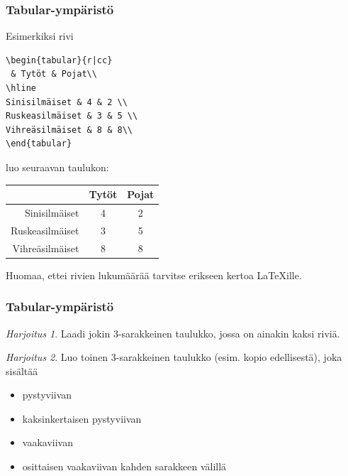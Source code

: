 \documentclass[handout]{beamer}
\theoremstyle{remark}
\newtheorem{harj}{Harjoitus}[section]
\begin{document}
\begin{frame}[fragile]
\frametitle{Tabular-ympäristö}
Esimerkiksi rivi
\begin{scriptsize}
\begin{Verbatim}[frame=single]
\begin{tabular}{r|cc}
 & Tytöt & Pojat\\
\hline
Sinisilmäiset & 4 & 2 \\
Ruskeasilmäiset & 3 & 5 \\
Vihreäsilmäiset & 8 & 8\\
\end{tabular}
\end{Verbatim}
\end{scriptsize}
luo seuraavan taulukon:
\begin{framed} 
\begin{tabular}{r|cc}
 & Tytöt & Pojat\\
\hline
Sinisilmäiset & 4 & 2 \\
Ruskeasilmäiset & 3 & 5 \\
Vihreäsilmäiset & 8 & 8\\
\end{tabular}
\end{framed}
Huomaa, ettei rivien lukumäärää tarvitse erikseen kertoa \LaTeX ille.

\end{frame}



\begin{frame}[fragile]
\frametitle{Tabular-ympäristö}
\begin{harj}
Laadi jokin 3-sarakkeinen taulukko, jossa on ainakin kaksi riviä.  
\end{harj}
\begin{harj}
Luo toinen 3-sarakkeinen taulukko (esim. kopio edellisestä), joka sisältää 
\begin{itemize}
\item pystyviivan
\item kaksinkertaisen pystyviivan
\item vaakaviivan
\item osittaisen vaakaviivan kahden sarakkeen välillä
\end{itemize}
\end{harj}
\end{frame}
\end{document}
